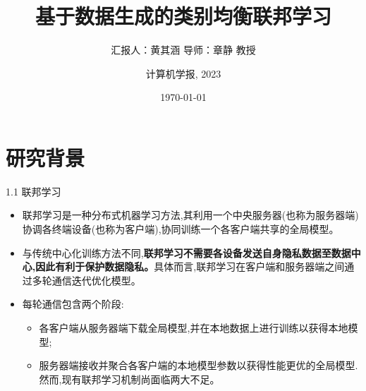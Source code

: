 \documentclass{sintefbeamer}
\title{\huge 基于数据生成的类别均衡联邦学习}
\subtitle{汇报人：黄其涵 \qquad 导师：章静 教授 \qquad }
\author{计算机学报, 2023}
\date{\today}
\theoremstyle{definition}
\begin{document}
\maketitle


\section{研究背景}{}

\begin{frame}{1.1 联邦学习}
\begin{itemize}
\item 联邦学习是一种分布式机器学习方法,其利用一个中央服务器(也称为服务器端)协调各终端设备(也称为客户端),协同训练一个各客户端共享的全局模型。

\item 与传统中心化训练方法不同,\textbf{联邦学习不需要各设备发送自身隐私数据至数据中心,因此有利于保护数据隐私。}具体而言,联邦学习在客户端和服务器端之间通过多轮通信迭代优化模型。
\item 每轮通信包含两个阶段:
\begin{itemize}
\item[(1)]各客户端从服务器端下载全局模型,并在本地数据上进行训练以获得本地模型;
\item[(2)]服务器端接收并聚合各客户端的本地模型参数以获得性能更优的全局模型.然而,现有联邦学习机制尚面临两大不足。
\end{itemize}
\end{itemize}



\end{frame}
\end{document}
